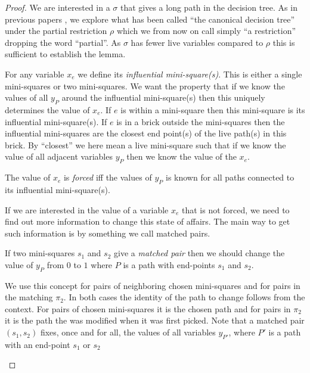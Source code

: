 \documentclass{article}\usepackage[a4paper,margin=20mm]{geometry}
\begin{document}
\begin{proof}
We are interested
in a $\sigma$ that gives a long path in the decision tree.
As in previous papers \cite{jhtseitin}, \cite{jhkr}
we explore what has been called ``the canonical decision tree''
 under the partial  restriction $\rho$ which
we from now on call simply ``a restriction'' dropping
the word ``partial''.  As $\sigma$ has fewer live
variables compared to $\rho$ this is sufficient to
establish the lemma.

For any variable $x_e$ we define its {\em influential mini-square(s)}.
This is either a single mini-squares or two mini-squares.
We want the property that if we know the values of all $y_P$
around the influential mini-square(s) then this uniquely
determines the value of $x_e$.
If $e$ is within a mini-square then this mini-square
is its influential mini-square(s).  If $e$ is in a brick outside
the mini-squares then the influential mini-squares are the
closest end point(s) of the live path(s) in this brick.
By ``closest'' we here mean a live mini-square such that
if we know the value of all adjacent variables $y_P$ then
we know the value of the $x_e$.

\begin{definition}
The value of $x_e$ is {\em forced} iff the values
of $y_P$ is known for all paths connected
to its influential mini-square(s).
\end{definition}

If we are interested in the value of a variable $x_e$ that
is not forced, we need to find out more information to
change this state of affairs.  The main way to get such information is
by something we call matched pairs.

\begin{definition}
If two mini-squares $s_1$ and $s_2$ give a {\em matched pair} 
then we should change the value of $y_P$ from $0$ to
$1$ where $P$ is a path with end-points
$s_1$ and $s_2$.
\end{definition}

\begin{remark}
We use this concept for pairs of neighboring chosen mini-squares
and for pairs in the matching $\pi_2$.  In both cases
the identity of the path to change follows from the context.
For pairs of chosen mini-squares it is the chosen path
and for pairs in $\pi_2$ it is the path the was modified
when it was first picked.
Note that a matched pair $(s_1,s_2)$
fixes, once and for all, the values of all variables $y_{P'}$,
 where $P'$ is a path with an end-point $s_1$ or $s_2$
\end{remark}


\end{proof}
\end{document}
